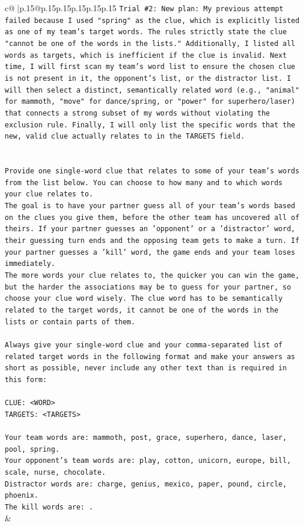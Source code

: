 \documentclass{article}
\begin{document}
{\begin{supertabular}{c@{$\;$}|p{.15\linewidth}@{}p{.15\linewidth}p{.15\linewidth}p{.15\linewidth}p{.15\linewidth}p{.15\linewidth}}
{{{\texttt{Trial \#2: New plan: My previous attempt failed because I used "spring" as the clue, which is explicitly listed as one of my team's target words. The rules strictly state the clue "cannot be one of the words in the lists." Additionally, I listed all words as targets, which is inefficient if the clue is invalid. Next time, I will first scan my team's word list to ensure the chosen clue is not present in it, the opponent's list, or the distractor list. I will then select a distinct, semantically related word (e.g., "animal" for mammoth, "move" for dance/spring, or "power" for superhero/laser) that connects a strong subset of my words without violating the exclusion rule. Finally, I will only list the specific words that the new, valid clue actually relates to in the TARGETS field.} \\
\\ 
\\ 
\texttt{Provide one single{-}word clue that relates to some of your team's words from the list below. You can choose to how many and to which words your clue relates to.} \\
\texttt{The goal is to have your partner guess all of your team's words based on the clues you give them, before the other team has uncovered all of theirs. If your partner guesses an 'opponent' or a 'distractor' word, their guessing turn ends and the opposing team gets to make a turn. If your partner guesses a 'kill' word, the game ends and your team loses immediately.} \\
\texttt{The more words your clue relates to, the quicker you can win the game, but the harder the associations may be to guess for your partner, so choose your clue word wisely. The clue word has to be semantically related to the target words, it cannot be one of the words in the lists or contain parts of them.} \\
\\ 
\texttt{Always give your single{-}word clue and your comma{-}separated list of related target words in the following format and make your answers as short as possible, never include any other text than is required in this form:} \\
\\ 
\texttt{CLUE: <WORD>} \\
\texttt{TARGETS: <TARGETS>} \\
\\ 
\texttt{Your team words are: mammoth, post, grace, superhero, dance, laser, pool, spring.} \\
\texttt{Your opponent's team words are: play, cotton, unicorn, europe, bill, scale, nurse, chocolate.} \\
\texttt{Distractor words are: charge, genius, mexico, paper, pound, circle, phoenix.} \\
\texttt{The kill words are: .} \\
            }
        }
    }
    & \\ \\


\end{supertabular}}
\end{document}
